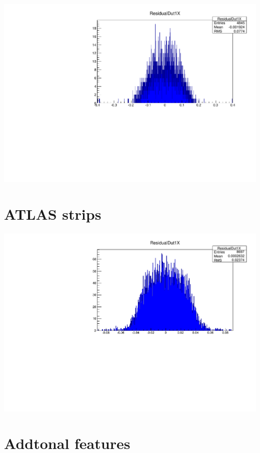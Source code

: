\documentclass[a0,portrait]{a0poster}
\begin{document}
\begin{multicols}{2}
\begin{center}
\includegraphics[width=0.7\linewidth]{figures/resXpixel.pdf}
\label{trine}
\end{center}

\section*{ATLAS strips}
\begin{center}
\includegraphics[width=0.7\linewidth]{figures/Res1D.pdf}
\label{trine}
\end{center}


\section*{Addtonal features}

\end{multicols}
\end{document}
